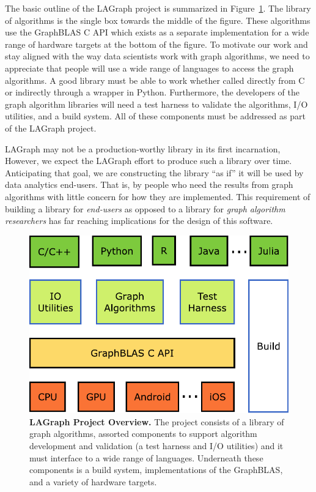 The basic outline of the LAGraph project  is summarized in 
Figure~\ref{fig:overview}. The library of algorithms is the single box towards
the middle of the figure.  These algorithms use the GraphBLAS C API
which exists as a separate implementation for a wide range of hardware
targets at the bottom of the figure.  To motivate our work and stay aligned 
with the way data scientists work with graph algorithms, we need to appreciate that
people will use a wide range of languages to access the graph algorithms.  A good library
must be able to work whether called directly from C or indirectly through a wrapper in Python.
Furthermore, the developers of the graph algorithm libraries will need a test harness to
validate the algorithms, I/O utilities, and a build system.  All of these components must
be addressed as part of the LAGraph project. 

LAGraph may not be a production-worthy library in its first incarnation,  
However, we expect the LAGraph effort to produce such a library over time.  
Anticipating that goal, we are constructing
the library ``as if'' it will be used by data analytics end-users. That is, by people
who need the results from graph algorithms with little concern for how they are
implemented.  This requirement of building a library for \emph{end-users} as opposed to 
a library for \emph{graph algorithm researchers} has far reaching implications for the 
design of this software.

\begin{figure}[t]
	\includegraphics[width=\linewidth]{fig/lagraph}
	\caption{\textbf{LAGraph Project Overview.} The project consists of a library of 
	graph algorithms, assorted components to support algorithm development and validation
	(a test harness and I/O utilities) and it must interface to a wide range of languages.
	Underneath these components is a build system, implementations of the GraphBLAS,
	and a variety of hardware targets. \label{fig:overview}}
\end{figure}

